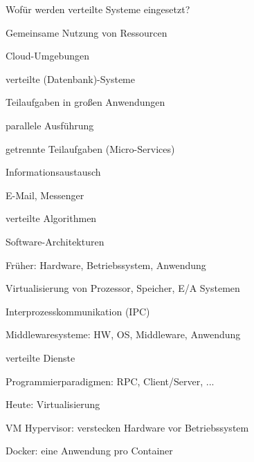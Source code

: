 \documentclass[10pt]{article}
\begin{document}
\begin{itemize*}
Wofür werden verteilte Systeme eingesetzt?
\begin{itemize*}
  \item Gemeinsame Nutzung von Ressourcen
  \begin{itemize*}
    \item Cloud-Umgebungen
    \item verteilte (Datenbank)-Systeme
  \end{itemize*}
  \item Teilaufgaben in großen Anwendungen
  \begin{itemize*}
    \item parallele Ausführung
    \item getrennte Teilaufgaben (Micro-Services)
  \end{itemize*}
  \item Informationsaustausch
  \begin{itemize*}
    \item E-Mail, Messenger
    \item verteilte Algorithmen
  \end{itemize*}
\end{itemize*}

Software-Architekturen
\begin{itemize*}
  \item Früher: Hardware, Betriebssystem, Anwendung
  \begin{itemize*}
    \item Virtualisierung von Prozessor, Speicher, E/A Systemen
    \item Interprozesskommunikation (IPC)
  \end{itemize*}
  \item Middlewaresysteme: HW, OS, Middleware, Anwendung
  \begin{itemize*}
    \item verteilte Dienste
    \item Programmierparadigmen: RPC, Client/Server, ...
  \end{itemize*}
  \item Heute: Virtualisierung
  \begin{itemize*}
    \item VM Hypervisor: verstecken Hardware vor Betriebssystem
    \item Docker: eine Anwendung pro Container
  \end{itemize*}
\end{itemize*}



\end{itemize*}
\end{document}
